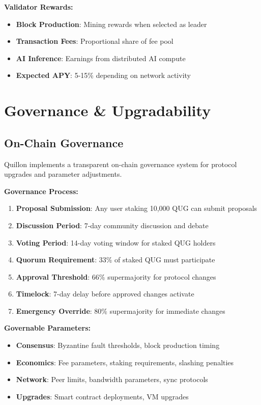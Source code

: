 \documentclass[11pt,a4paper]{scrartcl}
\begin{document}
\textbf{Validator Rewards:}
\begin{itemize}
\item \textbf{Block Production}: Mining rewards when selected as leader
\item \textbf{Transaction Fees}: Proportional share of fee pool
\item \textbf{AI Inference}: Earnings from distributed AI compute
\item \textbf{Expected APY}: 5-15\% depending on network activity
\end{itemize}

\newpage

\section{Governance \& Upgradability}

\subsection{On-Chain Governance}

Quillon implements a transparent on-chain governance system for protocol upgrades and parameter adjustments.

\textbf{Governance Process:}

\begin{enumerate}
\item \textbf{Proposal Submission}: Any user staking 10,000 QUG can submit proposals
\item \textbf{Discussion Period}: 7-day community discussion and debate
\item \textbf{Voting Period}: 14-day voting window for staked QUG holders
\item \textbf{Quorum Requirement}: 33\% of staked QUG must participate
\item \textbf{Approval Threshold}: 66\% supermajority for protocol changes
\item \textbf{Timelock}: 7-day delay before approved changes activate
\item \textbf{Emergency Override}: 80\% supermajority for immediate changes
\end{enumerate}

\textbf{Governable Parameters:}
\begin{itemize}
\item \textbf{Consensus}: Byzantine fault thresholds, block production timing
\item \textbf{Economics}: Fee parameters, staking requirements, slashing penalties
\item \textbf{Network}: Peer limits, bandwidth parameters, sync protocols
\item \textbf{Upgrades}: Smart contract deployments, VM upgrades
\end{itemize}
\end{document}
